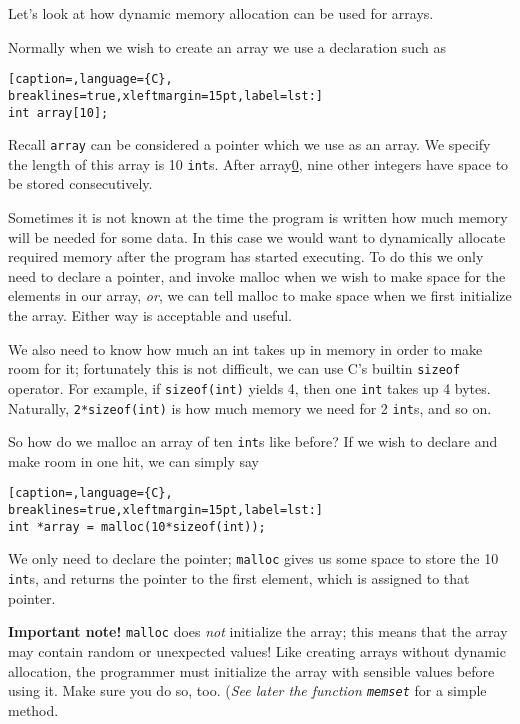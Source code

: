 Let's look at how dynamic memory allocation can be used for arrays.

Normally when we wish to create an array we use a declaration such as
\lstset{basicstyle=\scriptsize, numbers=left, captionpos=b, tabsize=4}
\begin{lstlisting}[caption=,language={C},
breaklines=true,xleftmargin=15pt,label=lst:]
int array[10];
\end{lstlisting}

Recall \texttt{array} can be considered a pointer which we use as an array. We
specify the length of this array is 10 \texttt{int}s. After array\url{0}, nine
other integers have space to be stored consecutively.

Sometimes it is not known at the time the program is written how much memory
will be needed for some data. In this case we would want to dynamically
allocate required memory after the program has started executing.  To do this
we only need to declare a pointer, and invoke malloc when we wish to make space
for the elements in our array, \emph{or}, we can tell malloc to make space when
we first initialize the array. Either way is acceptable and useful.

We also need to know how much an int takes up in memory in order to make room
for it; fortunately this is not difficult, we can use C's builtin
\texttt{sizeof} operator. For example, if \texttt{sizeof(int)} yields 4, then
one \texttt{int} takes up 4 bytes. Naturally, \texttt{2*sizeof(int)} is how
much memory we need for 2 \texttt{int}s, and so on.

So how do we malloc an array of ten \texttt{int}s like before? If we wish to
declare and make room in one hit, we can simply say
\lstset{basicstyle=\scriptsize, numbers=left, captionpos=b, tabsize=4}
\begin{lstlisting}[caption=,language={C},
breaklines=true,xleftmargin=15pt,label=lst:]
int *array = malloc(10*sizeof(int));
\end{lstlisting}

We only need to declare the pointer; \texttt{malloc} gives us some space to
store the 10 \texttt{int}s, and returns the pointer to the first element, which
is assigned to that pointer.

\textbf{Important note!} \texttt{malloc} does \emph{not} initialize the array;
this means that the array may contain random or unexpected values! Like
creating arrays without dynamic allocation, the programmer must initialize the
array with sensible values before using it. Make sure you do so, too.
(\emph{See later the function \texttt{memset}} for a simple method.

